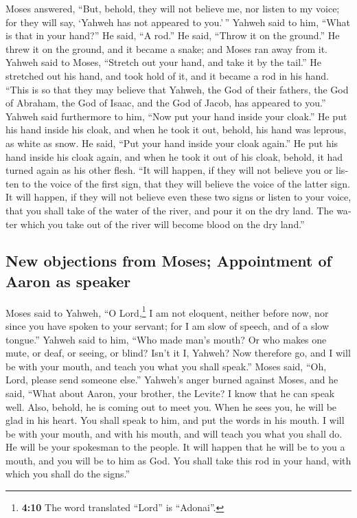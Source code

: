 \begin{paracol}{2}
\begin{otherlanguage}{english}
 Moses answered, ``But, behold, they will not believe me,
nor listen to my voice; for they will say, `Yahweh has not appeared to
you.'\,''  Yahweh said to him, ``What is that in your
hand?'' He said, ``A rod.''  He said, ``Throw it on the
ground.'' He threw it on the ground, and it became a snake; and Moses
ran away from it.  Yahweh said to Moses, ``Stretch out
your hand, and take it by the tail.'' He stretched out his hand, and
took hold of it, and it became a rod in his hand.  ``This
is so that they may believe that Yahweh, the God of their fathers, the
God of Abraham, the God of Isaac, and the God of Jacob, has appeared to
you.''  Yahweh said furthermore to him, ``Now put your
hand inside your cloak.'' He put his hand inside his cloak, and when he
took it out, behold, his hand was leprous, as white as snow.
 He said, ``Put your hand inside your cloak again.'' He
put his hand inside his cloak again, and when he took it out of his
cloak, behold, it had turned again as his other flesh. 
``It will happen, if they will not believe you or listen to the voice of
the first sign, that they will believe the voice of the latter sign.
 It will happen, if they will not believe even these two
signs or listen to your voice, that you shall take of the water of the
river, and pour it on the dry land. The water which you take out of the
river will become blood on the dry land.''

\hypertarget{new-objections-from-moses-appointment-of-aaron-as-speaker}{%
\subsection{New objections from Moses; Appointment of Aaron as
speaker}\label{new-objections-from-moses-appointment-of-aaron-as-speaker}}

 Moses said to Yahweh, ``O Lord,\footnote{\textbf{4:10}
  The word translated ``Lord'' is ``Adonai''.} I am not eloquent,
neither before now, nor since you have spoken to your servant; for I am
slow of speech, and of a slow tongue.''  Yahweh said to
him, ``Who made man's mouth? Or who makes one mute, or deaf, or seeing,
or blind? Isn't it I, Yahweh?  Now therefore go, and I
will be with your mouth, and teach you what you shall speak.''
 Moses said, ``Oh, Lord, please send someone else.''
 Yahweh's anger burned against Moses, and he said, ``What
about Aaron, your brother, the Levite? I know that he can speak well.
Also, behold, he is coming out to meet you. When he sees you, he will be
glad in his heart.  You shall speak to him, and put the
words in his mouth. I will be with your mouth, and with his mouth, and
will teach you what you shall do.  He will be your
spokesman to the people. It will happen that he will be to you a mouth,
and you will be to him as God.  You shall take this rod
in your hand, with which you shall do the signs.''


\end{otherlanguage}
\end{paracol}

